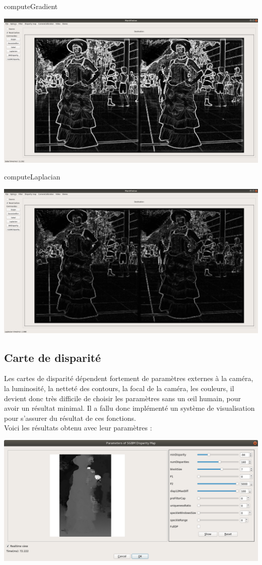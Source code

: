 \documentclass{article}
\begin{document}
computeGradient

\includegraphics[width=\linewidth]{img/gradient.png}

computeLaplacian

\includegraphics[width=\linewidth]{img/laplacian.png}


\newpage
\subsection{Carte de disparité}

Les cartes de disparité dépendent fortement de paramètres externes à la caméra, la luminosité, la netteté des contours, la focal de la caméra, les couleurs, il devient donc très difficile de choisir les paramètres sans un œil humain, pour avoir un résultat minimal. Il a fallu donc implémenté un système de visualisation pour s'assurer du résultat de ces fonctions.\\

Voici les résultats obtenu avec leur paramètres :

\includegraphics[width=\linewidth]{img/bm.png}
\end{document}
